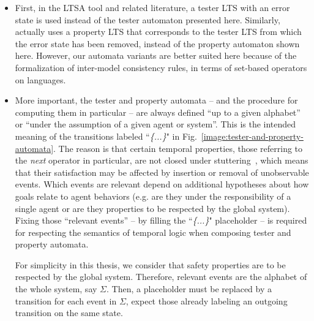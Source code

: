 \begin{itemize}

\item First, in the LTSA tool \cite{Magee:1999} and related literature, a tester LTS with an error state is used instead of the tester automaton presented here. Similarly, \cite{Letier:2005, Letier:2008} actually uses a property LTS that corresponds to the tester LTS from which the error state has been removed, instead of the property automaton shown here. However, our automata variants are better suited here because of the formalization of inter-model consistency rules, in terms of set-based operators on languages. 

\item More important, the tester and property automata -- and the procedure for computing them in particular -- are always defined ``up to a given alphabet'' or ``under the assumption of a given agent or system''. This is the intended meaning of the transitions labeled ``\emph{\{...\}}" in Fig.~\ref{image:tester-and-property-automata}. The reason is that certain temporal properties, those referring to the \emph{next} operator in particular, are not closed under stuttering~\cite{Lamport:1994}, which means that their satisfaction may be affected by insertion or removal of unobservable events. Which events are relevant depend on additional hypotheses about how goals relate to agent behaviors (e.g. are they under the responsibility of a single agent or are they properties to be respected by the global system). Fixing those ``relevant events'' -- by filling the ``\emph{\{...\}}" placeholder -- is required for respecting the semantics of temporal logic when composing tester and property automata. 

For simplicity in this thesis, we consider that safety properties are to be respected by the global system. Therefore, relevant events are the alphabet of the whole system, say $\Sigma$. Then, a placeholder must be replaced by a transition for each event in $\Sigma$, expect those already labeling an outgoing transition on the same state.

\end{itemize}
